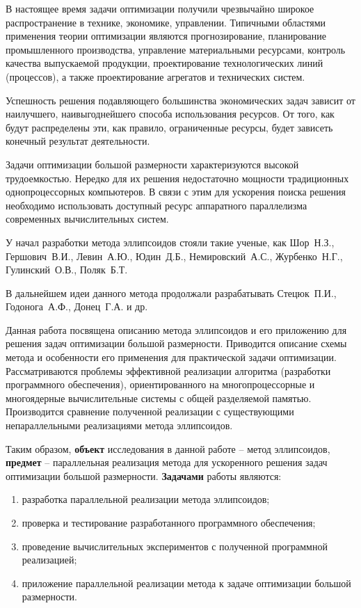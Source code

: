 
В настоящее время задачи оптимизации получили чрезвычайно широкое распространение в технике, экономике, управлении. Типичными областями применения теории оптимизации являются прогнозирование, планирование промышленного производства, управление материальными ресурсами, контроль качества выпускаемой продукции, проектирование технологических линий (процессов), а также проектирование агрегатов и технических систем.

Успешность решения подавляющего большинства экономических задач зависит от наилучшего, наивыгоднейшего способа использования ресурсов. От того, как будут распределены эти, как правило, ограниченные ресурсы, будет зависеть конечный результат деятельности.

Задачи оптимизации большой размерности характеризуются высокой трудоемкостью. Нередко для их решения недостаточно мощности традиционных однопроцессорных компьютеров. В связи с этим для ускорения поиска решения необходимо использовать доступный ресурс аппаратного параллелизма современных вычислительных систем.

У начал разработки метода эллипсоидов стояли такие ученые, как Шор~Н.З., Гершович~В.И., Левин~А.Ю., Юдин~Д.Б., Немировский~А.С., Журбенко~Н.Г., Гулинский~О.В., Поляк~Б.Т.

В дальнейшем идеи данного метода продолжали разрабатывать Стецюк~П.И., Годонога~А.Ф., Донец~Г.А. и др.

Данная работа посвящена описанию метода эллипсоидов и его приложению для решения задач оптимизации большой размерности. Приводится описание схемы метода и особенности его применения для практической задачи оптимизации. Рассматриваются проблемы эффективной реализации алгоритма (разработки программного обеспечения), ориентированного на многопроцессорные и многоядерные вычислительные системы с общей разделяемой памятью. Производится сравнение полученной реализации с существующими непараллельными реализациями метода эллипсоидов.

Таким образом, \textbf{объект} исследования в данной работе -- метод эллипсоидов, \textbf{предмет} -- параллельная реализация метода для ускоренного решения задач оптимизации большой размерности.
\textbf{Задачами} работы являются:

\begin{enumerate}
	\item разработка параллельной реализации метода эллипсоидов;
	\item проверка и тестирование разработанного программного обеспечения;
	\item проведение вычислительных экспериментов с полученной программной реализацией;
	\item приложение параллельной реализации метода к задаче оптимизации большой размерности.
\end{enumerate}

